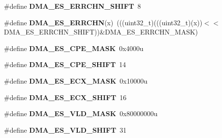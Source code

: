 \begin{DoxyCompactItemize}
\item 
\#define {\bfseries D\+M\+A\+\_\+\+E\+S\+\_\+\+E\+R\+R\+C\+H\+N\+\_\+\+S\+H\+I\+FT}~8\hypertarget{group__DMA__Register__Masks_ga67f75f97e4bc971fa4044115d2831ede}{}\label{group__DMA__Register__Masks_ga67f75f97e4bc971fa4044115d2831ede}

\item 
\#define {\bfseries D\+M\+A\+\_\+\+E\+S\+\_\+\+E\+R\+R\+C\+HN}(x)~(((uint32\+\_\+t)(((uint32\+\_\+t)(x))$<$$<$D\+M\+A\+\_\+\+E\+S\+\_\+\+E\+R\+R\+C\+H\+N\+\_\+\+S\+H\+I\+FT))\&D\+M\+A\+\_\+\+E\+S\+\_\+\+E\+R\+R\+C\+H\+N\+\_\+\+M\+A\+SK)\hypertarget{group__DMA__Register__Masks_ga8110274a770ce169f7f5f3136b55431a}{}\label{group__DMA__Register__Masks_ga8110274a770ce169f7f5f3136b55431a}

\item 
\#define {\bfseries D\+M\+A\+\_\+\+E\+S\+\_\+\+C\+P\+E\+\_\+\+M\+A\+SK}~0x4000u\hypertarget{group__DMA__Register__Masks_ga49f6b77458101e61786c204ff60998cb}{}\label{group__DMA__Register__Masks_ga49f6b77458101e61786c204ff60998cb}

\item 
\#define {\bfseries D\+M\+A\+\_\+\+E\+S\+\_\+\+C\+P\+E\+\_\+\+S\+H\+I\+FT}~14\hypertarget{group__DMA__Register__Masks_ga58313d5021ff6e2f0c8a55652c10316b}{}\label{group__DMA__Register__Masks_ga58313d5021ff6e2f0c8a55652c10316b}

\item 
\#define {\bfseries D\+M\+A\+\_\+\+E\+S\+\_\+\+E\+C\+X\+\_\+\+M\+A\+SK}~0x10000u\hypertarget{group__DMA__Register__Masks_ga0781c93c4ce1aa7e73719e9679b6de77}{}\label{group__DMA__Register__Masks_ga0781c93c4ce1aa7e73719e9679b6de77}

\item 
\#define {\bfseries D\+M\+A\+\_\+\+E\+S\+\_\+\+E\+C\+X\+\_\+\+S\+H\+I\+FT}~16\hypertarget{group__DMA__Register__Masks_ga008fd21305ccc358efafd3c27e03c809}{}\label{group__DMA__Register__Masks_ga008fd21305ccc358efafd3c27e03c809}

\item 
\#define {\bfseries D\+M\+A\+\_\+\+E\+S\+\_\+\+V\+L\+D\+\_\+\+M\+A\+SK}~0x80000000u\hypertarget{group__DMA__Register__Masks_ga01506c3abe9cad680a827d4157d09c75}{}\label{group__DMA__Register__Masks_ga01506c3abe9cad680a827d4157d09c75}

\item 
\#define {\bfseries D\+M\+A\+\_\+\+E\+S\+\_\+\+V\+L\+D\+\_\+\+S\+H\+I\+FT}~31\hypertarget{group__DMA__Register__Masks_gaa1e0a184778d19c1c48cc52f941b0d2c}{}\label{group__DMA__Register__Masks_gaa1e0a184778d19c1c48cc52f941b0d2c}


\end{DoxyCompactItemize}
